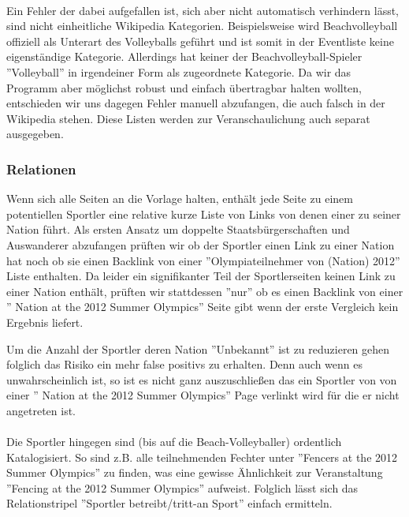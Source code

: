 \documentclass[pagesize=auto, titlepage=on]{scrartcl}
\begin{document}
\paragraph{}
Ein Fehler der dabei aufgefallen ist, sich aber nicht automatisch verhindern lässt, sind nicht einheitliche Wikipedia Kategorien.
Beispielsweise wird Beachvolleyball offiziell als Unterart des Volleyballs geführt und ist somit in der Eventliste keine eigenständige Kategorie.
Allerdings hat keiner der Beachvolleyball-Spieler ''Volleyball'' in irgendeiner Form als zugeordnete Kategorie.
Da wir das Programm aber möglichst robust und einfach übertragbar halten wollten, entschieden wir uns dagegen Fehler manuell abzufangen, die auch falsch in der Wikipedia stehen. Diese Listen werden zur Veranschaulichung auch separat ausgegeben.
\subsubsection{Relationen}
Wenn sich alle Seiten an die Vorlage halten, enthält jede Seite zu einem potentiellen Sportler eine relative kurze Liste von Links von denen einer zu seiner Nation führt. 
Als ersten Ansatz um doppelte Staatsbürgerschaften und Auswanderer abzufangen prüften wir ob der Sportler einen Link zu einer Nation hat noch ob sie einen Backlink von einer ''Olympiateilnehmer  von (Nation)  2012'' Liste enthalten.  
Da leider ein signifikanter Teil der Sportlerseiten keinen Link zu einer Nation enthält, prüften wir stattdessen ''nur'' ob es einen Backlink von einer   '' Nation at the 2012 Summer Olympics'' Seite gibt wenn der erste Vergleich kein Ergebnis liefert.

Um die Anzahl der Sportler deren Nation ''Unbekannt'' ist zu reduzieren gehen folglich das Risiko ein mehr false positivs zu erhalten.
Denn auch wenn es unwahrscheinlich ist, so ist es nicht ganz auszuschließen das ein Sportler von von einer  '' Nation at the 2012 Summer Olympics'' Page verlinkt wird für die er nicht angetreten ist.

\paragraph{}
Die Sportler hingegen sind (bis auf die Beach-Volleyballer) ordentlich Katalogisiert. So sind z.B. alle teilnehmenden Fechter unter ''Fencers at the 2012 Summer Olympics'' zu finden, 
was eine gewisse Ähnlichkeit zur Veranstaltung ''Fencing at the 2012 Summer Olympics'' aufweist.
Folglich lässt sich das Relationstripel ''Sportler betreibt/tritt-an Sport'' einfach ermitteln.
\end{document}
